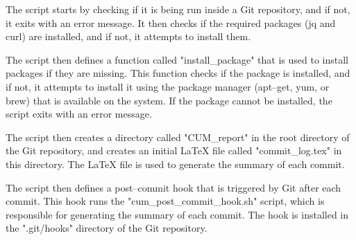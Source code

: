 \documentclass{article}
\begin{document}
{The script starts by checking if it is being run inside a Git repository, and if not, it exits with an error message. It then checks if the required packages (jq and curl) are installed, and if not, it attempts to install them.

The script then defines a function called "install\_package" that is used to install packages if they are missing. This function checks if the package is installed, and if not, it attempts to install it using the package manager (apt--get, yum, or brew) that is available on the system. If the package cannot be installed, the script exits with an error message.

The script then creates a directory called "CUM\_report" in the root directory of the Git repository, and creates an initial LaTeX file called "commit\_log.tex" in this directory. The LaTeX file is used to generate the summary of each commit.

The script then defines a post--commit hook that is triggered by Git after each commit. This hook runs the "cum\_post\_commit\_hook.sh" script, which is responsible for generating the summary of each commit. The hook is installed in the ".git/hooks" directory of the Git repository.

}
\end{document}
